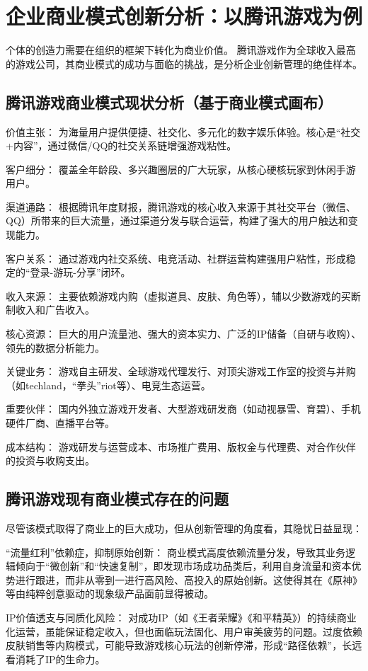 \documentclass[supercite]{HustGSClassPaper}
\begin{document}
	\section{企业商业模式创新分析：以腾讯游戏为例}
	个体的创造力需要在组织的框架下转化为商业价值。
	腾讯游戏作为全球收入最高的游戏公司，其商业模式的成功与面临的挑战，是分析企业创新管理的绝佳样本。
	\subsection{腾讯游戏商业模式现状分析（基于商业模式画布）\cite{osterwalder2010business}}
	价值主张： 为海量用户提供便捷、社交化、多元化的数字娱乐体验。核心是“社交+内容”，通过微信/QQ的社交关系链增强游戏粘性。

	客户细分： 覆盖全年龄段、多兴趣圈层的广大玩家，从核心硬核玩家到休闲手游用户。

	渠道通路： 根据腾讯年度财报\cite{tencent2023report}，腾讯游戏的核心收入来源于其社交平台（微信、QQ）所带来的巨大流量，通过渠道分发与联合运营，构建了强大的用户触达和变现能力。

	客户关系： 通过游戏内社交系统、电竞活动、社群运营构建强用户粘性，形成稳定的“登录-游玩-分享”闭环。

	收入来源： 主要依赖游戏内购（虚拟道具、皮肤、角色等），辅以少数游戏的买断制收入和广告收入。

	核心资源： 巨大的用户流量池、强大的资本实力、广泛的IP储备（自研与收购）、领先的数据分析能力。

	关键业务： 游戏自主研发、全球游戏代理发行、对顶尖游戏工作室的投资与并购（如techland，“拳头”riot等）、电竞生态运营。

	重要伙伴： 国内外独立游戏开发者、大型游戏研发商（如动视暴雪、育碧）、手机硬件厂商、直播平台等。

	成本结构： 游戏研发与运营成本、市场推广费用、版权金与代理费、对合作伙伴的投资与收购支出。
	\subsection{腾讯游戏现有商业模式存在的问题}
	尽管该模式取得了商业上的巨大成功，但从创新管理的角度看，其隐忧日益显现：

	“流量红利”依赖症，抑制原始创新： 商业模式高度依赖流量分发，导致其业务逻辑倾向于“微创新”和“快速复制”，即发现市场成功品类后，利用自身流量和资本优势进行跟进，而非从零到一进行高风险、高投入的原始创新。这使得其在《原神》等由纯粹创意驱动的现象级产品面前显得被动。
	
	IP价值透支与同质化风险： 对成功IP（如《王者荣耀》《和平精英》）的持续商业化运营，虽能保证稳定收入，但也面临玩法固化、用户审美疲劳的问题。过度依赖皮肤销售等内购模式，可能导致游戏核心玩法的创新停滞，形成“路径依赖”，长远看消耗了IP的生命力。
	
\end{document}
